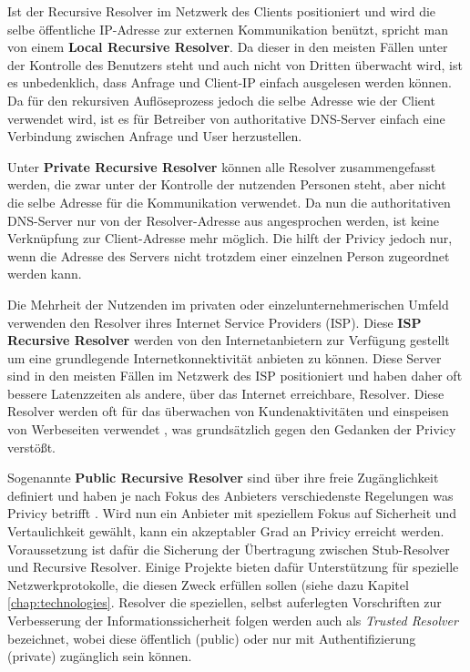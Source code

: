 Ist der Recursive Resolver im Netzwerk des Clients positioniert und wird die selbe öffentliche IP-Adresse zur externen Kommunikation benützt, spricht man von einem \textbf{Local Recursive Resolver}. Da dieser in den meisten Fällen unter der Kontrolle des Benutzers steht und auch nicht von Dritten überwacht wird, ist es unbedenklich, dass Anfrage und Client-IP einfach ausgelesen werden können. Da für den rekursiven Auflöseprozess jedoch die selbe Adresse wie der Client verwendet wird, ist es für Betreiber von authoritative DNS-Server einfach eine Verbindung zwischen Anfrage und User herzustellen.  

Unter \textbf{Private Recursive Resolver} können alle Resolver zusammengefasst werden, die zwar unter der Kontrolle der nutzenden Personen steht, aber nicht die selbe Adresse für die Kommunikation verwendet. Da nun die authoritativen DNS-Server nur von der Resolver-Adresse aus angesprochen werden, ist keine Verknüpfung zur Client-Adresse mehr möglich. Die hilft der Privicy jedoch nur, wenn die Adresse des Servers nicht trotzdem einer einzelnen Person zugeordnet werden kann.

Die Mehrheit der Nutzenden im privaten oder einzelunternehmerischen Umfeld verwenden den Resolver ihres Internet Service Providers (ISP). Diese \textbf{ISP Recursive Resolver} werden von den Internetanbietern zur Verfügung gestellt um eine grundlegende Internetkonnektivität anbieten zu können. Diese Server sind in den meisten Fällen im Netzwerk des ISP positioniert und haben daher oft bessere Latenzzeiten als andere, über das Internet erreichbare, Resolver. Diese Resolver werden oft für das überwachen von Kundenaktivitäten und einspeisen von Werbeseiten verwendet \cite{Weaver2011}, was grundsätzlich gegen den Gedanken der Privicy verstößt.

Sogenannte \textbf{Public Recursive Resolver} sind über ihre freie Zugänglichkeit definiert und haben je nach Fokus des Anbieters verschiedenste Regelungen was Privicy betrifft \cite{Prince2018}\cite{Quad92018}. Wird nun ein Anbieter mit speziellem Fokus auf Sicherheit und Vertaulichkeit gewählt, kann ein akzeptabler Grad an Privicy erreicht werden. Voraussetzung ist dafür die Sicherung der Übertragung zwischen Stub-Resolver und Recursive Resolver. Einige Projekte bieten dafür Unterstützung für spezielle Netzwerkprotokolle, die diesen Zweck erfüllen sollen (siehe dazu Kapitel \ref{chap:technologies}. Resolver die speziellen, selbst auferlegten Vorschriften zur Verbesserung der Informationssicherheit folgen werden auch als \textit{Trusted Resolver} bezeichnet, wobei diese öffentlich (public) oder nur mit Authentifizierung (private) zugänglich sein können.

